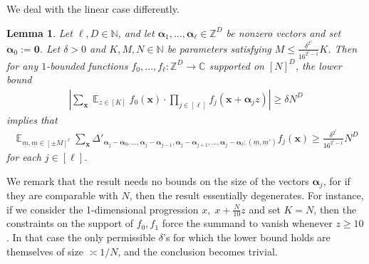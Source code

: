 \documentclass[11pt]{amsart}
\newtheorem{lemma}{Lemma}[section]
\theoremstyle{definition}
\DeclareMathOperator*{\E}{\mathbb{E}}
\newcommand{\C}{{\mathbb C}}
\newcommand{\N}{{\mathbb N}}
\newcommand{\Z}{{\mathbb Z}}
\newcommand{\bx}{{\mathbf{x}}}
\newcommand{\balpha}{{\boldsymbol{\alpha}}}
\newcommand{\um}{{\underline{m}}}
\newcommand{\abs}[1]{\mathopen{}\left| #1\mathclose{}\right|}
\begin{document}
    We deal with the linear case differently. 
    \begin{lemma}\label{L: linear averages}
    Let $\ell, D\in\N$, and let $\balpha_{1}, \ldots, \balpha_\ell\in\Z^D$ be nonzero vectors and set $\balpha_0 := \mathbf{0}$. Let $\delta>0$ and $K, M, N\in\N$ be parameters satisfying $M\leq \frac{\delta^{2^\ell}}{16^{2^\ell - 1}}K$. Then %
    for any $1$-bounded functions $f_0, \ldots, f_\ell:\Z^D\to\C$ supported on $[N]^D$, the lower bound
    \begin{align*}
        \abs{\sum_{\bx}\E_{z\in[K]}f_0(\bx)\cdot \prod_{j\in[\ell]}f_j(\bx+\balpha_j z)}\geq \delta N^D
    \end{align*}
    implies that
    \begin{align*}
        \E_{\um,\um\in[\pm M]^\ell}\sum_{\bx} \Delta'_{\balpha_j - \balpha_0, \ldots,  \balpha_j - \balpha_{j-1}, \balpha_j - \balpha_{j+1}, \ldots, \balpha_j - \balpha_{\ell}; (\um,\um')} f_j(\bx) \geq \frac{\delta^{2^\ell}}{16^{2^\ell - 1}} N^D
    \end{align*}
    for each $j\in[\ell]$.
\end{lemma}
{We remark that the result needs no bounds on the size of the vectors $\balpha_j$, for if they are comparable with $N$, then the result essentially degenerates. For instance, if we consider the 1-dimensional progression $x,\; x+\frac{N}{10}z$ and set $K = N$, then the constraints on the support of $f_0, f_1$ force the summand to vanish whenever $z\geq 10$. In that case the only permissible $\delta$'s for which the lower bound holds are themselves of size $\asymp 1/N$, and the conclusion becomes trivial.}
\end{document}
